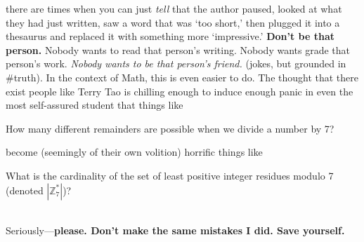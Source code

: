 \documentclass[10pt]{article}
\newcommand\ZZ{{\mathbb Z}}
\theoremstyle{definition}
\begin{document}
{there are times when you can just \emph{tell} that the author paused,
looked at what they had just written, saw a word that was `too short,'
then plugged it into a thesaurus and replaced it with something more
`impressive.'  \textbf{Don't be that person.}  Nobody wants to read
that person's writing.  Nobody wants grade that person's work.
\emph{Nobody wants to be that person's friend.} (jokes, but grounded
in \#truth).  In the context of Math, this is even easier to do.  The
thought that there exist people like Terry Tao is chilling enough to
induce enough panic in even the most self-assured student that things
like
\begin{center}
How many different remainders are possible when we divide a number by 7?
\end{center}
become (seemingly of their own volition) horrific things like \\
\begin{adjustwidth}{.05\linewidth}{}
What is the cardinality of the set of least positive integer residues
modulo 7 (denoted $|\ZZ_7^*|$)?
\end{adjustwidth}~\\
Seriously---\textbf{please.  Don't make the same mistakes I did.  Save yourself.}
}
\end{document}
